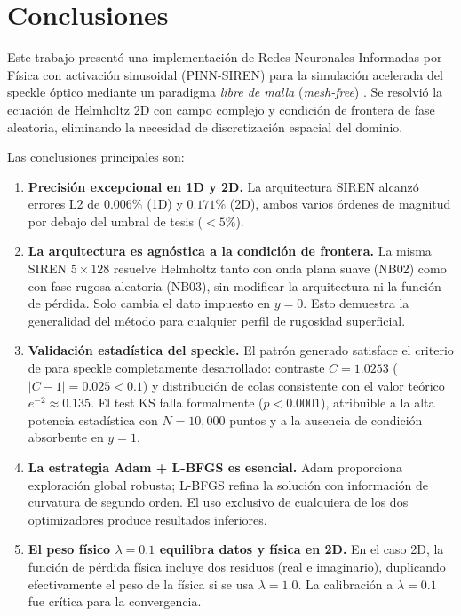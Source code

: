 
\section{Conclusiones}
\label{sec:conclusiones}

Este trabajo presentó una implementación de Redes Neuronales Informadas por Física
con activación sinusoidal (PINN-SIREN) para la simulación acelerada del speckle óptico
mediante un paradigma \textit{libre de malla} (\textit{mesh-free})
\citep{Karniadakis2021_review, Cuomo2022_review}.
Se resolvió la ecuación de Helmholtz 2D con campo complejo y condición de frontera de
fase aleatoria, eliminando la necesidad de discretización espacial del dominio.

Las conclusiones principales son:

\begin{enumerate}
  \item \textbf{Precisión excepcional en 1D y 2D.}
    La arquitectura SIREN alcanzó errores L2 de $0.006\%$ (1D) y $0.171\%$ (2D),
    ambos varios órdenes de magnitud por debajo del umbral de tesis ($< 5\%$).

  \item \textbf{La arquitectura es agnóstica a la condición de frontera.}
    La misma SIREN $5\times128$ resuelve Helmholtz tanto con onda plana suave (NB02)
    como con fase rugosa aleatoria (NB03), sin modificar la arquitectura ni la función
    de pérdida.
    Solo cambia el dato impuesto en $y = 0$.
    Esto demuestra la generalidad del método para cualquier perfil de rugosidad superficial.

  \item \textbf{Validación estadística del speckle.}
    El patrón generado satisface el criterio de \citet{Goodman2007_Speckle}
    para speckle completamente desarrollado: contraste $C = 1.0253$ ($|C-1| = 0.025 < 0.1$)
    y distribución de colas consistente con el valor teórico $e^{-2} \approx 0.135$.
    El test KS falla formalmente ($p < 0.0001$), atribuible a la alta potencia estadística
    con $N = 10{,}000$ puntos y a la ausencia de condición absorbente en $y = 1$.

  \item \textbf{La estrategia Adam + L-BFGS es esencial.}
    Adam proporciona exploración global robusta; L-BFGS refina la solución con
    información de curvatura de segundo orden.
    El uso exclusivo de cualquiera de los dos optimizadores produce resultados inferiores.

  \item \textbf{El peso físico $\lambda = 0.1$ equilibra datos y física en 2D.}
    En el caso 2D, la función de pérdida física incluye dos residuos (real e imaginario),
    duplicando efectivamente el peso de la física si se usa $\lambda = 1.0$.
    La calibración a $\lambda = 0.1$ fue crítica para la convergencia.
\end{enumerate}

